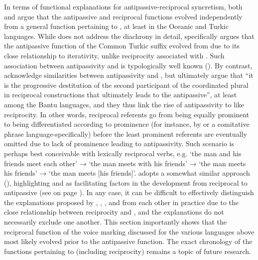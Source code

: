 In terms of functional explanations for antipassive-reciprocal syncretism, both \citet{janic:2016} and \citet{gandon:2018} argue that the antipassive and reciprocal functions evolved independently from a general function pertaining to , at least in the Oceanic and Turkic languages. While \citet{janic:2016} does not address the diachrony in detail, \citet{gandon:2018} specifically argues that the antipassive function of the Common Turkic suffix  evolved from  due to its close relationship to iterativity, unlike reciprocity associated with . Such association between antipassivity and  is typologically well known (\citealt{polinsky:2017}). By contrast, \citet[759]{bostoen:al:2015} acknowledge similarities between antipassivity and , but ultimately argue that “it is the progressive destitution of the second participant of the coordinated plural  in reciprocal constructions that ultimately leads to the antipassive”, at least among the Bantu languages, and they thus link the rise of antipassivity to  like reciprocity. In other words, reciprocal referents go from being equally prominent to being differentiated according to prominence (for instance, by  or a comitative phrase language-specifically) before the least prominent referents are eventually omitted due to lack of prominence leading to antipassivity. Such scenario is perhaps best conceivable with lexically reciprocal verbs, e.g. ‘the man and his friends meet each other’ → ‘the man meets with his friends’ → ‘the man meets his friends’ → ‘the man meets [his friends]’. \citet{sanso:2017, sanso:2018} adopts a somewhat similar approach (), highlighting  and  as facilitating factors in the development from reciprocal to antipassive (see  on page \pageref{fig:ch7:antp-refl}). In any case, it can be difficult to effectively distinguish the explanations proposed by \citet{janic:2016}, \citet{gandon:2018}, \citet{bostoen:al:2015}, and \citet{sanso:2017, sanso:2018} from each other in practice due to the close relationship between reciprocity and , and the explanations do not necessarily exclude one another. This section importantly shows that the reciprocal function of the voice marking discussed for the various languages above most likely evolved prior to the antipassive function. The exact chronology of the functions pertaining to  (including reciprocity) remains a topic of future research.

